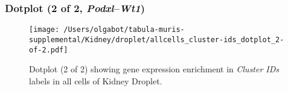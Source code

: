 \clearpage

\subsubsection{Dotplot (2 of 2, \emph{Podxl}--\emph{Wt1})}
\begin{figure}[h]
\centering
\texttt{[image: /Users/olgabot/tabula-muris-supplemental/Kidney/droplet/allcells\_cluster-ids\_dotplot\_2-of-2.pdf]}

\caption{ Dotplot (2 of 2)  showing gene expression enrichment in \emph{Cluster IDs} labels in all cells of Kidney Droplet. }
\end{figure}

